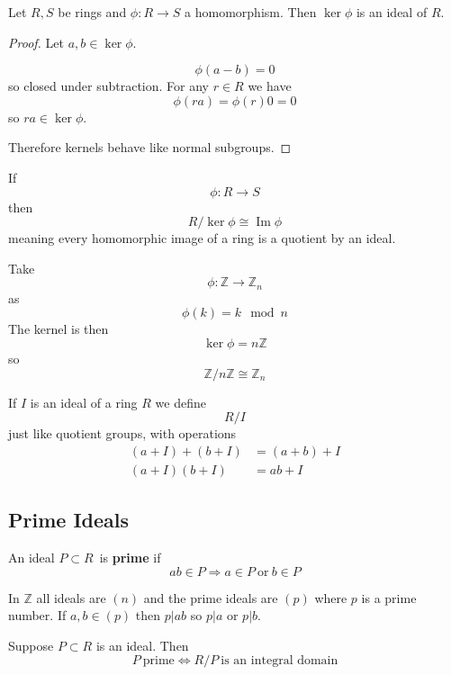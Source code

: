 \begin{thm}
    Let $R,S$ be rings and $\phi : R \to S$ a homomorphism. 
    Then $\ker \phi$ is an ideal of $R$.
\end{thm}
\begin{proof}
    Let $a,b \in \ker \phi$.

    \[
        \phi(a-b) = 0
    \]
    so closed under subtraction. 
    For any $r\in R$ we have 
    \[
        \phi(ra) = \phi(r)0 = 0
    \]
    so $ra \in \ker \phi$.

    Therefore kernels behave like normal subgroups.
\end{proof}

\begin{thm}
    If 
    \[
        \phi : R \to S
    \]
    then 
    \[
        R/\ker \phi \cong \operatorname{Im} \phi
    \]
    meaning every homomorphic image of a ring is a quotient 
    by an ideal.
\end{thm}
\begin{ex}
    Take 
    \[
        \phi : \mathbb Z \to \mathbb Z_n
    \]
    as 
    \[
        \phi(k) = k \mod n
    \]
    The kernel is then 
    \[
        \ker \phi = n\mathbb Z
    \]
    so 
    \[
        \mathbb Z/n\mathbb Z \cong \mathbb Z_n
    \]
\end{ex}
\begin{defn}
    If $I$ is an ideal of a ring $R$ we define 
    \[
        R/I
    \]
    just like quotient groups, with operations 
    \begin{align*}
        (a+I) + (b + I) &= (a+b) + I \\ 
        (a+I)(b+I) &= ab + I 
    \end{align*}
\end{defn}

\subsection{Prime Ideals}
\begin{defn}
    An ideal $P \subset R$ is \textbf{prime} if 
    \[
        ab \in P \Rightarrow a \in P \ \text{or} \ b \in P
    \]
\end{defn}
\begin{ex}
    In $\mathbb Z$ all ideals are $(n)$ and the prime ideals are 
    $(p)$ where $p$ is a prime number. 
    If $a,b\in (p)$ then $p | ab$ so $p | a$ or $p | b$.
\end{ex}
\begin{thm}
    Suppose $P \subset R$ is an ideal.
    Then 
    \[
        P \ \text{prime} \Leftrightarrow R/P \ \text{is an integral 
        domain}
    \]
\end{thm}

